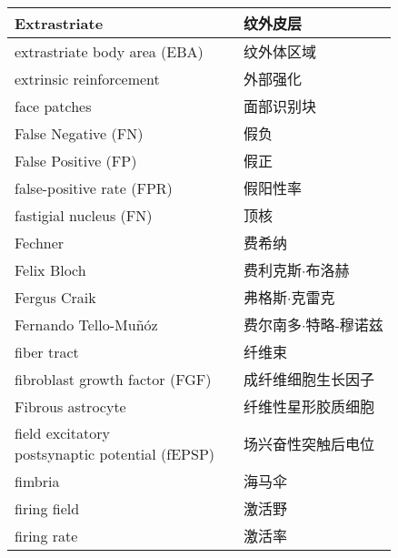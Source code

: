 \begin{longtable}{lll}
	\midrule
	Extrastriate     && 纹外皮层   \\
	
	\midrule
	extrastriate body area  (EBA)   && 纹外体区域   \\
	
	\midrule
	extrinsic reinforcement   && 外部强化   \\
	
	\midrule
	face patches   && 面部识别块   \\
	
	\midrule
	False Negative (FN)    &&  假负  \\
	
	\midrule
	False Positive (FP)    &&  假正  \\
	
	\midrule
	false-positive rate (FPR)    &&  假阳性率  \\
	
	\midrule
	fastigial nucleus (FN)     &&  顶核  \\
	
	\midrule
	Fechner     &&  费希纳  \\
	
	\midrule
	Felix Bloch     &&  费利克斯$\cdot$布洛赫  \\
	
	\midrule
	Fergus Craik     &&  弗格斯$\cdot$克雷克  \\
	
	\midrule
	Fernando Tello-Muñóz     &&  费尔南多$\cdot$特略-穆诺兹  \\
	
	\midrule
	fiber tract     &&  纤维束  \\
	
	\midrule
	fibroblast growth factor (FGF)    &&  成纤维细胞生长因子  \\
	
	\midrule
	Fibrous astrocyte     &&  纤维性星形胶质细胞  \\
	
	\midrule
	\makecell[l]{field excitatory \\postsynaptic potential (fEPSP)}     &&  场兴奋性突触后电位  \\
	
	\midrule
	fimbria     &&  海马伞  \\
	
	\midrule
	firing field     &&  激活野  \\
	
	\midrule
	firing rate     &&  激活率  \\
	

\end{longtable}
